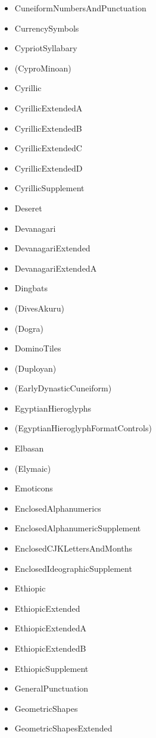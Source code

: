\documentclass{article}
\newenvironment{itemlist}{%
  \begin{itemize}
  \setlength{\itemsep}{0pt}
  \setlength{\parsep}{0pt}
  \setlength{\topsep}{0pt}
  \setlength{\partopsep}{0pt}
  \setlength{\parskip}{0pt}
  \setlength{\labelsep}{5pt}}%
{
  \end{itemize}}
\begin{document}
\begin{multicols*}{2}
\begin{itemlist}
        \item CuneiformNumbersAndPunctuation
        \item CurrencySymbols
        \item CypriotSyllabary
        \item (CyproMinoan)
        \item Cyrillic
        \item CyrillicExtendedA
        \item CyrillicExtendedB
        \item CyrillicExtendedC
        \item CyrillicExtendedD
        \item CyrillicSupplement
        \item Deseret
        \item Devanagari
        \item DevanagariExtended
        \item DevanagariExtendedA
        \item Dingbats
        \item (DivesAkuru)
        \item (Dogra)
        \item DominoTiles
        \item (Duployan)
        \item (EarlyDynasticCuneiform)
        \item EgyptianHieroglyphs
        \item (EgyptianHieroglyphFormatControls)
        \item Elbasan
        \item (Elymaic)
        \item Emoticons
        \item EnclosedAlphanumerics
        \item EnclosedAlphanumericSupplement
        \item EnclosedCJKLettersAndMonths
        \item EnclosedIdeographicSupplement
        \item Ethiopic
        \item EthiopicExtended
        \item EthiopicExtendedA
        \item EthiopicExtendedB
        \item EthiopicSupplement
        \item GeneralPunctuation
        \item GeometricShapes
        \item GeometricShapesExtended

\end{itemlist}
\end{multicols*}
\end{document}
